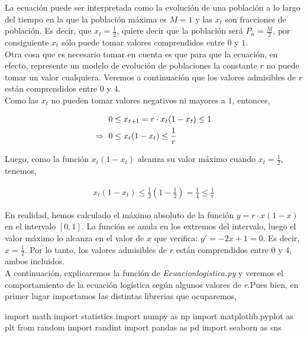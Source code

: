\documentclass[10pt,a4paper]{article}
\begin{document}
	La ecuación puede ser interpretada como la evolución de una población a lo largo del tiempo en la que la población máxima es $M = 1$ y las $x_t$ son fracciones de población. Es decir, que $x_t = \frac{1}{2}$, quiere decir que la población será $P_n = \frac{M}{2}$, por consiguiente $x_t$ sólo puede tomar valores comprendidos entre $0$ y $1$.\\
		
	 Otra cosa que es necesario tomar en cuenta es que para que la ecuación, en efecto, represente un modelo de evolución de poblaciones la constante $r$ no puede tomar un valor cualquiera. Veremos a continuación que los valores admisibles de $r$  están comprendidos entre $0$ y $4$.\\	
	 
	 Como las $x_t$ no pueden tomar valores negativos ni mayores a $1$, entonces,
	 
	 \begin{align*}
	 & 0 \leq x_{t+1} = r\cdot x_t(1-x_t) \leq 1 \\
	 \Rightarrow \hspace{.2cm} & 0 \leq x_t(1-x_t) \leq \frac{1}{r}
	 \end{align*}
	 
	 Luego, como la función $x_t(1-x_t)$ alcanza su valor máximo cuando $x_t = \frac{1}{2}$, tenemos,
	 
	 \begin{align*}
	 x_t(1-x_t) \leq \frac{1}{2}(1 - \frac{1}{2}) = \frac{1}{4} \leq \frac{1}{r}
	 \end{align*}
		
	En realidad, hemos calculado el máximo absoluto de la función $y = r\cdot x (1 - x)$ en el intervalo $[0,1]$. La función se anula en los extremos del intervalo, luego el valor máximo lo alcanza en el valor de $x$ que verifica: $y' = -2x + 1 = 0$. Es decir, $x = \frac{1}{2}$. Por lo tanto, los valores admisibles de $r$ están comprendidos entre $0$ y $4$, ambos incluidos.\\
	
	A continuación, explicaremos la función de \textit{Ecuacionlogistica.py} y veremos el comportamiento de la ecuación logística según algunos valores de $r$.Pues bien, en primer lugar importamos las distintas librerias  que ocuparemos, 	
	
\begin{python}
import math
import statistics
import numpy as np 
import matplotlib.pyplot as plt 
from random import randint 
import pandas as pd 
import seaborn as sns
\end{python}
\end{document}
